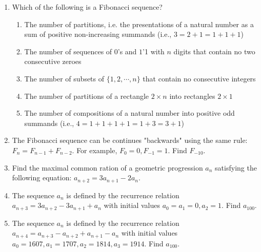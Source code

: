 \begin{enumerate}
\item Which of the following is a Fibonacci sequence?
\begin{enumerate}
\item The number of partitions, i.e. the presentations of a natural number as a sum of positive non-increasing summands (i.e., $3=2+1=1+1+1$)
\item The number of sequences of $0$'s and $1$'1 with $n$ digits that contain no two consecutive zeroes
\item The number of subsets of $\{1,2, \cdots, n\}$ that contain no consecutive integers
\item The number of partitions of a rectangle $2 \times n$ into rectangles $2 \times 1$
\item The number of compositions of a natural number into positive odd summands (i.e., $4=1+1+1+1=1+3=3+1$)
\end{enumerate}
\item The Fibonacci sequence can be continues "backwards" using the same rule: $F_n=F_{n-1}+F_{n-2}$. For example, $F_0=0, F_{-1}=1$. Find $F_{-10}$.
\item Find the maximal common ration of a geometric progression $a_n$ satisfying the following equation: $a_{n+2}=3a_{n+1}-2a_n$.
\item The sequence $a_n$ is defined by the recurrence relation $a_{n+3}=3a_{n+2}-3a_{n+1}+a_n$ with initial values $a_0=a_1=0, a_2=1$. Find $a_{100}$.
\item The sequence $a_n$ is defined by the recurrence relation $a_{n+4}=a_{n+3}-a_{n+2}+a_{n+1}-a_n$ with initial values $a_0=1607, a_1=1707, a_2=1814, a_3=1914$. Find $a_{100}$.
\end{enumerate}